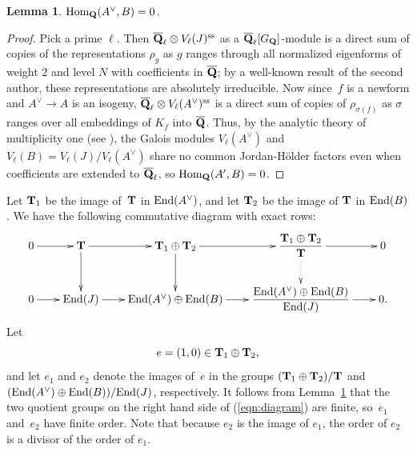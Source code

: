 \documentclass[10pt,twoside]{article}
\newcommand{\Q}{{\bf{Q}}}
\newcommand{\Qbar}{{\overline{\Q}}}
\newcommand{\T}{{\bf{T}}}
\newcommand{\tensor}{\otimes}
\newcommand{\Adual}{A^{\vee}}
\newcommand{\Hom}{{\rm Hom}}
\newcommand{\End}{{\rm End}}
\newtheorem{lem}{Lemma}[section]
\theoremstyle{definition}
\DeclareMathOperator{\sss}{ss}
\renewcommand{\ss}{\sss}
\begin{document}
\begin{lem}\label{lem:homzero}
$\Hom_\Q(\Adual,B)=0$. 
\end{lem}
\begin{proof}

  Pick a prime $\ell$.  Then $\Qbar_{\ell} \tensor V_{\ell} (J)^{\ss}$
  as a $\Qbar_{\ell}[G_\Q]$-module is a direct sum of copies of the
  representations $\rho_g$ as $g$ ranges through all normalized
  eigenforms of weight $2$ and level $N$ with coefficients in $\Qbar$;
  by a well-known result of the second author, these representations
  are absolutely irreducible.  Now since~$f$ is a newform and
  $A^{\vee} \to A$ is an isogeny, $\Qbar_{\ell} \tensor
  V_{\ell}(A^{\vee})^{\ss}$ is a direct sum of copies of
  $\rho_{\sigma(f)}$ as $\sigma$ ranges over all embeddings of $K_f$
  into $\Qbar$.  Thus, by the analytic theory of multiplicity one (see
  \cite[Cor.~3, pg.~300]{winnie:newforms}), the Galois modules
  $V_{\ell}(A^{\vee})$ and $V_{\ell}(B) =
  V_{\ell}(J)/V_{\ell}(A^{\vee})$ share no common Jordan-H\"older
  factors even when coefficients are extended to $\Qbar_{\ell}$, so
  $\Hom_\Q(A',B) = 0$.
\end{proof}


Let $\T_1$ be the image of~$\T$ in $\End(\Adual)$, 
and let $\T_2$ be the image of $\T$ in $\End(B)$. 
We have the following commutative diagram with exact rows:
\begin{equation}\label{eqn:diagram}
\xymatrix@=2em{
 0\ar[r] & {\T} \ar[r]\ar[d] & {\T_1\oplus \T_2} \ar[r]\ar[d] & 
                             {\displaystyle \frac{\T_1 \oplus \T_2}{\T}}\ar@{.>}[d]\ar[r] & 0\\
 0\ar[r] & {\End(J)} \ar[r] & {\End(\Adual)\oplus\End(B)} \ar[r] & 
          {\displaystyle \frac{\End(\Adual)\oplus\End(B)}{\End(J)}}\ar[r] & 0.\\
}
\end{equation}
Let 
$$
e=(1,0)\in \T_1 \oplus \T_2,
$$
and let $e_1$ and $e_2$ denote the images of~$e$ in the groups $(\T_1
\oplus \T_2)/\T$ and $(\End(\Adual) \oplus \End(B))/\End(J)$,
respectively.  It follows from Lemma~\ref{lem:homzero} that the two
quotient groups on the right hand side of (\ref{eqn:diagram}) are
finite, so~$e_1$ and~$e_2$ have finite order.  Note that because $e_2$
is the image of $e_1$, the order of $e_2$ is a divisor of the order of
$e_1$.
\end{document}
